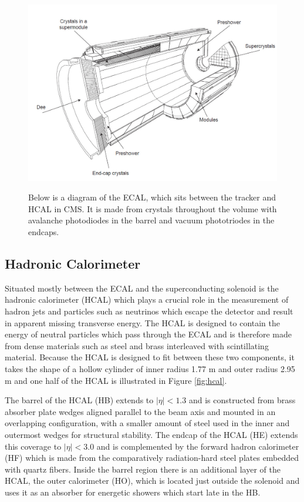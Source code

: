 \begin{figure}[tb]
\caption[The CMS Electromagnetic Calorimeter]{
 Below is a diagram of the ECAL, 
  which sits between the tracker and HCAL in CMS.
 It is made from \pbw crystals throughout the volume
  with avalanche photodiodes in the barrel
  and vacuum phototriodes in the endcaps.
 }
\includegraphics[width=\textwidth]{pdfs/experiment/cms_ecal.pdf}
\label{fig:ecal}
\end{figure}
 

 \subsection{Hadronic Calorimeter}
Situated mostly between the ECAL and the superconducting solenoid
 is the hadronic calorimeter (HCAL) which plays a
 crucial role in the measurement of hadron jets
 and particles such as neutrinos which escape the detector
 and result in apparent missing transverse energy.
The HCAL is designed to contain the energy of neutral
 particles which pass through the ECAL and is therefore made
 from dense materials such as 
 steel and brass interleaved with scintillating material.
Because the HCAL is designed to fit between these
 two components, it takes the shape of a hollow
 cylinder of inner radius 1.77 m and outer radius 2.95 m
 and one half of the HCAL is illustrated in Figure \ref{fig:hcal}.

The barrel of the HCAL (HB) extends to $|\eta|<1.3$ 
 and is constructed from brass absorber plate wedges aligned parallel 
 to the beam axis and mounted in an overlapping configuration,
 with a smaller amount of steel used in the inner and outermost
 wedges for structural stability.
The endcap of the HCAL (HE) extends this coverage to $|\eta|<3.0$
 and is complemented by the forward hadron calorimeter (HF)
 which is made from the comparatively radiation-hard 
 steel plates embedded with quartz fibers.
Inside the barrel region there is an additional layer of the
 HCAL, the outer calorimeter (HO), which is located just
 outside the solenoid and uses it as an absorber 
 for energetic showers which start late in the HB.

